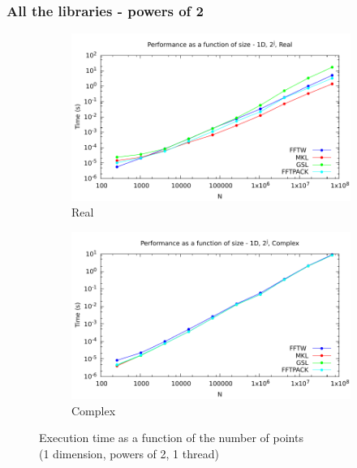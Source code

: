 \documentclass[12pt, a4paper]{article}
\begin{document}
\subsubsection{All the libraries - powers of 2}
\begin{figure}[H]
\captionsetup{width=0.8\linewidth}
\centering
\begin{subfigure}{.5\textwidth}
\centering
\includegraphics[width=.9\linewidth]{graphs/performance/1d-pow2-r.pdf}
\caption{Real}
\label{1DPOW2R}
\end{subfigure}%
\begin{subfigure}{.5\textwidth}
\centering
\includegraphics[width=.9\linewidth]{graphs/performance/1d-pow2-c.pdf}
\caption{Complex}
\label{1DPOW2C}
\end{subfigure}
\caption{Execution time as a function of the number of points\\(1 dimension, powers of 2, 1 thread)}
\label{1DPOW2}
\end{figure}
\end{document}
